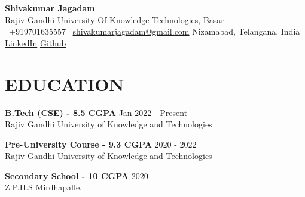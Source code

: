 \documentclass[a4paper,10pt]{article}
\begin{document}
	\small
	\begin{center}
		{\LARGE \textbf{Shivakumar Jagadam}} \\
		Rajiv Gandhi University Of Knowledge Technologies, Basar \\
		\faPhone\ +919701635557 \quad \faEnvelope\ \href{mailto:shivakumarjagadam@gmail.com}{shivakumarjagadam@gmail.com} \quad Nizamabad, Telangana, India \quad \href{https://www.linkedin.com/in/shivakumar-jagadam-12559425a/}{LinkedIn} \quad \href{https://github.com/Shivakumarjagadam}{Github}
	\end{center}
	
	\vspace{0.2cm}
	
	\section*{EDUCATION}
	\vspace{0.2cm}
	\noindent\textbf{B.Tech (CSE) - 8.5 CGPA} \hfill Jan 2022 - Present \\
	Rajiv Gandhi University of Knowledge and Technologies
	
	\vspace{0.2cm}
	
	\noindent\textbf{Pre-University Course - 9.3 CGPA} \hfill 2020 - 2022 \\
	Rajiv Gandhi University of Knowledge and Technologies
	
	\vspace{0.2cm}
	
	\noindent\textbf{Secondary School - 10 CGPA} \hfill 2020 \\
	Z.P.H.S Mirdhapalle.
	
	\vspace{0.2cm}
	
\end{document}
